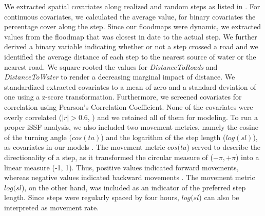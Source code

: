 \documentclass[abstract=on,10pt,a4paper,bibliography=totocnumbered]{scrartcl}
\begin{document}
We extracted spatial covariates along realized and random steps as listed in
. For continuous covariates, we calculated the average
value, for binary covariates the percentage cover along the step. Since our
floodmaps were dynamic, we extracted values from the floodmap that was closest
in date to the actual step. We further derived a binary variable indicating
whether or not a step crossed a road and we identified the average distance of
each step to the nearest source of water or the nearest road. We square-rooted
the values for \textit{DistanceToRoads} and \textit{DistanceToWater} to render a
decreasing marginal impact of distance. We standardized extracted covariates to
a mean of zero and a standard deviation of one using a z-score transformation.
Furthermore, we screened covariates for correlation using Pearson's Correlation
Coefficient. None of the covariates were overly correlated (\(|r| > 0.6\),
\cite{Latham.2011}) and we retained all of them for modeling. To run a proper
iSSF analysis, we also included two movement metrics, namely the cosine of the
turning angle (\(cos(ta)\)) and the logarithm of the step length (\(log(sl)\)),
as covariates in our models \citep{Avgar.2016}. The movement metric \(cos(ta\))
served to describe the directionality of a step, as it transformed the circular
measure of (\(-\pi, +\pi\)) into a linear measure (-1, 1). Thus, positive values
indicated forward movements, whereas negative values indicated backward
movements \citep{Turchin.1998}. The movement metric \(log(sl\)), on the other
hand, was included as an indicator of the preferred step length. Since steps
were regularly spaced by four hours, \(log(sl\)) can also be interpreted as
movement rate.
\end{document}
